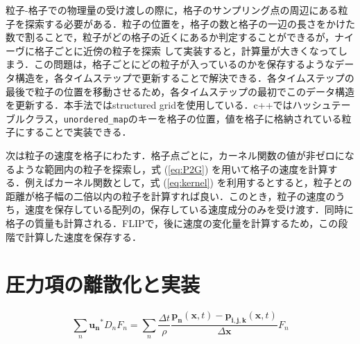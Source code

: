 \documentclass[a4j,12pt]{jreport}
\begin{document}
粒子-格子での物理量の受け渡しの際に，格子のサンプリング点の周辺にある粒子を探索する必要がある．粒子の位置を，格子の数と格子の一辺の長さをかけた数で割ることで，粒子がどの格子の近くにあるか判定することができるが，ナイーヴに格子ごとに近傍の粒子を探索
して実装すると，計算量が大きくなってしまう．この問題は，格子ごとにどの粒子が入っているのかを保存するようなデータ構造を，各タイムステップで更新することで解決できる．各タイムステップの最後で粒子の位置を移動させるため，各タイムステップの最初でこのデータ構造を更新する．本手法ではstructured gridを使用している．c++ではハッシュテーブルクラス，\texttt{unordered\_map}のキーを格子の位置，値を格子に格納されている粒子にすることで実装できる．

次は粒子の速度を格子にわたす．格子点ごとに，カーネル関数の値が非ゼロになるような範囲内の粒子を探索し，式 (\ref{eq:P2G}) を用いて格子の速度を計算する．例えばカーネル関数として，式 (\ref{eq:kernel}) を利用するとすると，粒子との距離が格子幅の二倍以内の粒子を計算すれば良い．このとき，粒子の速度のうち，速度を保存している配列の，保存している速度成分のみを受け渡す．同時に格子の質量も計算される．FLIPで，後に速度の変化量を計算するため，この段階で計算した速度を保存する．

\section{圧力項の離散化と実装} \label{sec:Imppressure}
\begin{equation}
\sum_{n}\bm{u_n}^*D_nF_n= \sum_{n}\frac{\varDelta t}{\rho}\frac{\bm{p_n} (\bm{x},t)  - \bm{p_{i,j,k}} (\bm{x},t) }{\varDelta \bm{x}}F_n
\end{equation}
\end{document}

